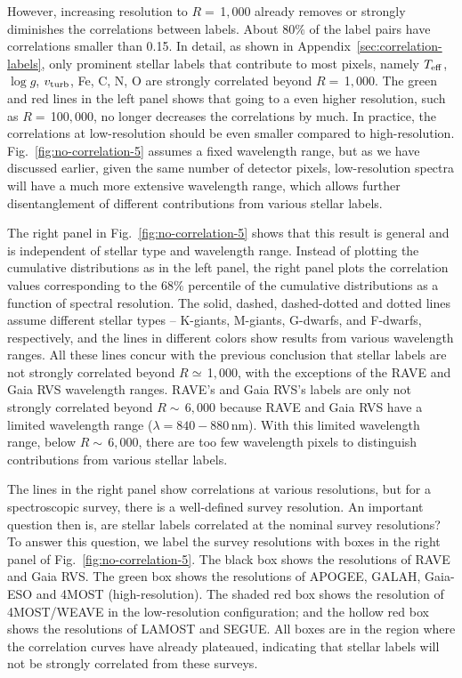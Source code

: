 \documentclass[iop]{emulateapj}
\begin{document}
\begin{CJK*}{UTF8}{gbsn}
However, increasing resolution to $R = \,$1$,$000 already removes or strongly diminishes the correlations between labels. About $80\%$ of the label pairs have correlations smaller than 0.15. In detail, as shown in Appendix~\ref{sec:correlation-labels}, only prominent stellar labels that contribute to most pixels, namely $T_{\rm eff}$, $\log g$, $v_{\rm turb}$, Fe, C, N, O are strongly correlated beyond $R =\,$1$,$000. The green and red lines in the left panel shows that going to a even higher resolution, such as $R = \,$100$,$000, no longer decreases the correlations by much. In practice, the correlations at low-resolution should be even smaller compared to high-resolution. Fig.~\ref{fig:no-correlation-5} assumes a fixed wavelength range, but as we have discussed earlier, given the same number of detector pixels, low-resolution spectra will have a much more extensive wavelength range, which allows further disentanglement of different contributions from various stellar labels.

The right panel in Fig.~\ref{fig:no-correlation-5} shows that this result is general and is independent of stellar type and wavelength range. Instead of plotting the cumulative distributions as in the left panel, the right panel plots the correlation values corresponding to the $68\%$ percentile of the cumulative distributions as a function of spectral resolution. The solid, dashed, dashed-dotted and dotted lines assume different stellar types -- K-giants, M-giants, G-dwarfs, and F-dwarfs, respectively, and the lines in different colors show results from various wavelength ranges. All these lines concur with the previous conclusion that stellar labels are not strongly correlated beyond $R \simeq \,$1$,$000, with the exceptions of the RAVE and Gaia RVS wavelength ranges. RAVE's and Gaia RVS's labels are only not strongly correlated beyond $R \sim \,$6$,$000 because RAVE and Gaia RVS have a limited wavelength range ($\lambda = 840-880 \,$nm). With this limited wavelength range, below $R \sim \,$6$,$000, there are too few wavelength pixels to distinguish contributions from various stellar labels.

The lines in the right panel show correlations at various resolutions, but for a spectroscopic survey, there is a well-defined survey resolution. An important question then is, are stellar labels correlated at the nominal survey resolutions? To answer this question, we label the survey resolutions with boxes in the right panel of Fig.~\ref{fig:no-correlation-5}. The black box shows the resolutions of RAVE and Gaia RVS. The green box shows the resolutions of APOGEE, GALAH, Gaia-ESO and 4MOST (high-resolution). The shaded red box shows the resolution of 4MOST/WEAVE in the low-resolution configuration; and the hollow red box shows the resolutions of LAMOST and SEGUE. All boxes are in the region where the correlation curves have already plateaued, indicating that stellar labels will not be strongly correlated from these surveys.


\end{CJK*}
\end{document}
